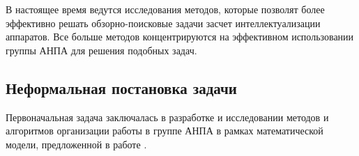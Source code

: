 \documentclass[a4paper,14pt,russian]{article}
\begin{document}
В настоящее время ведутся исследования методов, которые позволят более эффективно решать обзорно-поисковые задачи засчет интеллектуализации аппаратов. Все больше методов концентрируются на эффективном использовании группы АНПА для решения подобных задач.


\subsection{Неформальная постановка задачи}


Первоначальная задача заключалась в разработке и исследовании методов и алгоритмов организации работы в группе АНПА в рамках математической модели, предложенной в работе \cite{tuphanov}.



\end{document}
